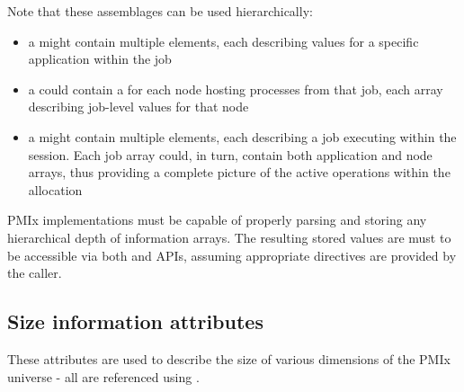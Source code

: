 %

Note that these assemblages can be used hierarchically:

\begin{itemize}
\item a  might contain multiple  elements, each describing values for a specific application within the job
\item a  could contain a  for each node hosting processes from that job, each array describing job-level values for that node
\item a  might contain multiple  elements, each describing a job executing within the session. Each job array could, in turn, contain both application and node arrays, thus providing a complete picture of the active operations within the allocation
\end{itemize}

\adviceimplstart
\ac{PMIx} implementations must be capable of properly parsing and storing any hierarchical depth of information arrays. The resulting stored values are must to be accessible via both  and  \acp{API}, assuming appropriate directives are provided by the caller.
\adviceimplend

\subsection{Size information attributes}
\label{api:struct:attributes:sizeinfo}

These attributes are used to describe the size of various dimensions of the PMIx universe - all are referenced using .

%

